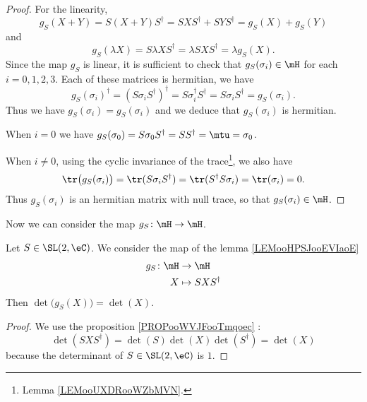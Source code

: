 \begin{proof}
	For the linearity,
	\begin{equation}
		g_S(X+Y)=S(X+Y)S^{\dag}=SXS^{\dag}+SYS^{\dag}=g_S(X)+g_S(Y)
	\end{equation}
	and
	\begin{equation}
		g_S(\lambda X)=S\lambda XS^{\dag}=\lambda SXS^{\dag}=\lambda g_S(X).
	\end{equation}
	Since the map \( g_S\) is linear, it is sufficient to check that \( g_S(\sigma_i)\in \mH\) for each \( i=0,1,2,3\). Each of these matrices is hermitian, we have
	\begin{equation}
		g_S(\sigma_i)^{\dag}=(S\sigma_iS^{\dag})^{\dag}=S\sigma_i^{\dag}S^{\dag}=S\sigma_iS^{\dag}=g_S(\sigma_i).
	\end{equation}
	Thus we have \( g_S(\sigma_i)=g_S(\sigma_i)\) and we deduce that \( g_S(\sigma_i)\) is hermitian.

	When \( i=0\) we have \( g_S(\sigma_0)=S\sigma_0S^{\dag}=SS^{\dag}=\mtu=\sigma_0\).

	When \( i\neq 0\), using the cyclic invariance of the trace\footnote{Lemma \ref{LEMooUXDRooWZbMVN}.}, we also have
	\begin{equation}
		\tr\big( g_S(\sigma_i) \big)=\tr(S\sigma_i S^{\dag})=\tr(S^{\dag}S\sigma_i)=\tr(\sigma_i)=0.
	\end{equation}
	Thus \( g_S(\sigma_i)\) is an hermitian matrix with null trace, so that \( g_S(\sigma_i)\in \mH\).
\end{proof}

Now we can consider the map \( g_S\colon \mH\to \mH\).

\begin{lemma}       \label{LEMooEDIMooNIURdn}
	Let \( S\in \SL(2,\eC)\). We consider the map of the lemma \ref{LEMooHPSJooEVIaoE}
	\begin{equation}
		\begin{aligned}
			g_S\colon \mH & \to \mH            \\
			X             & \mapsto SXS^{\dag}
		\end{aligned}
	\end{equation}
	Then \( \det\big( g_S(X) \big)=\det(X)\).
\end{lemma}

\begin{proof}
	We use the proposition \ref{PROPooWVJFooTmqoec} :
	\begin{equation}
		\det(SXS^{\dag})=\det(S)\det(X)\det(S^{\dag})=\det(X)
	\end{equation}
	because the determinant of \( S\in\SL(2,\eC)\) is \( 1\).
\end{proof}

